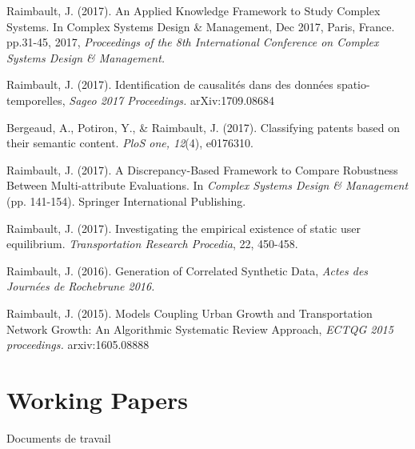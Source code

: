 \bigskip

\noindent Raimbault, J. (2017). An Applied Knowledge Framework to Study Complex Systems.%
In Complex Systems Design \& Management, Dec 2017, Paris, France. pp.31-45, 2017, \textit{Proceedings of the 8th International Conference on Complex Systems Design \& Management.}


\bigskip

\noindent Raimbault, J. (2017). Identification de causalités dans des données spatio-temporelles, \textit{Sageo 2017 Proceedings.} arXiv:1709.08684




\bigskip

\noindent Bergeaud, A., Potiron, Y., \& Raimbault, J. (2017). Classifying patents based on their semantic content. \textit{PloS one, 12}(4), e0176310.

\bigskip

\noindent Raimbault, J. (2017). A Discrepancy-Based Framework to Compare Robustness Between Multi-attribute Evaluations. In \textit{Complex Systems Design \& Management} (pp. 141-154). Springer International Publishing. 

\bigskip

\noindent Raimbault, J. (2017). Investigating the empirical existence of static user equilibrium. \textit{Transportation Research Procedia}, 22, 450-458. 


\bigskip


\noindent Raimbault, J. (2016). Generation of Correlated Synthetic Data, \textit{Actes des Journ{\'e}es de Rochebrune 2016.}


\bigskip

\noindent Raimbault, J. (2015). Models Coupling Urban Growth and Transportation Network Growth: An Algorithmic Systematic Review Approach, \textit{ECTQG 2015 proceedings.} arxiv:1605.08888



\section*{Working Papers}{Documents de travail}




